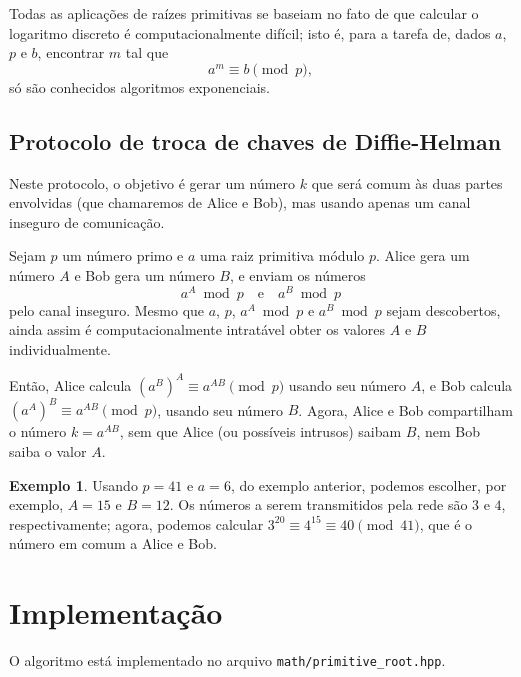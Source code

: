 \documentclass{article}
\theoremstyle{definition}
\newtheorem{example}{Exemplo}
\begin{document}
Todas as aplicações de raízes primitivas
se baseiam no fato de que calcular o logaritmo discreto
é computacionalmente difícil;
isto é, para a tarefa de,
dados $a$, $p$ e $b$,
encontrar $m$ tal que
\begin{equation*}
    a^m \equiv b \pmod p,
\end{equation*}
só são conhecidos algoritmos exponenciais.

\subsection{Protocolo de troca de chaves de Diffie-Helman}

Neste protocolo,
o objetivo é gerar um número $k$ que será comum às duas partes envolvidas
(que chamaremos de Alice e Bob),
mas usando apenas um canal inseguro de comunicação.

Sejam $p$ um número primo e $a$ uma raiz primitiva módulo $p$.
Alice gera um número $A$ e Bob gera um número $B$,
e enviam os números
\begin{equation*}
    a^A \bmod p \quad \text{e} \quad a^B \bmod p
\end{equation*}
pelo canal inseguro.
Mesmo que $a$, $p$, $a^A \bmod p$ e $a^B \bmod p$ sejam descobertos,
ainda assim é computacionalmente intratável
obter os valores $A$ e $B$ individualmente.

Então, Alice calcula $(a^B)^A \equiv a^{AB} \pmod p$
usando seu número $A$,
e Bob calcula $(a^A)^B \equiv a^{AB} \pmod p$,
usando seu número $B$.
Agora,
Alice e Bob compartilham o número $k = a^{AB}$,
sem que Alice (ou possíveis intrusos) saibam $B$,
nem Bob saiba o valor $A$.

\begin{example}
    Usando $p = 41$ e $a = 6$,
    do exemplo anterior,
    podemos escolher, por exemplo, $A = 15$ e $B = 12$.
    Os números a serem transmitidos pela rede
    são $3$ e $4$,
    respectivamente;
    agora,
    podemos calcular $3^{20} \equiv 4^{15} \equiv 40 \pmod{41}$,
    que é o número em comum a Alice e Bob.
\end{example}

\section{Implementação}

O algoritmo está implementado no arquivo \verb"math/primitive_root.hpp".
\end{document}
